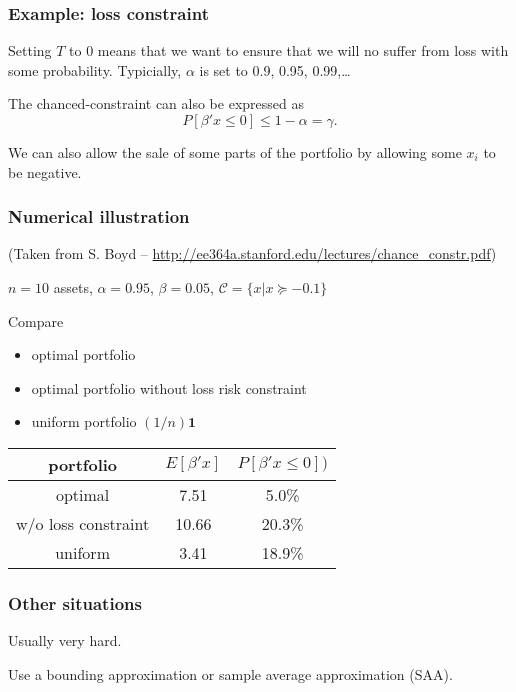 \documentclass{beamer}
\begin{document}
\begin{frame}
\frametitle{Example: loss constraint}

Setting $T$ to 0 means that we want to ensure that we will no suffer from loss with some probability. Typicially, $\alpha$ is set to 0.9, 0.95, 0.99,\ldots

\mbox{}

The chanced-constraint can also be expressed as
\[
P\left[ \beta' x \leq 0 \right] \leq 1-\alpha = \gamma.
\]

\mbox{}

We can also allow the sale of some parts of the portfolio by allowing some $x_i$ to be negative.
\end{frame}

\begin{frame}
\frametitle{Numerical illustration}

(Taken from S. Boyd -- \url{http://ee364a.stanford.edu/lectures/chance_constr.pdf})

$n = 10$ assets, $\alpha = 0.95$, $\beta = 0.05$, $\mathcal{C} = \{x | x \succeq -0.1\}$

\mbox{}

Compare
\begin{itemize}
\item
optimal portfolio
\item
optimal portfolio without loss risk constraint
\item
uniform portfolio $(1/n)\mathbf{1}$
\end{itemize}

\mbox{}

\begin{center}
\begin{tabular}{c|c|c}
portfolio & $E[\beta'x]$ & $P[\beta' x \leq 0])$ \\
\hline
optimal & 7.51 & 5.0\% \\
w/o loss constraint & 10.66 & 20.3\% \\
uniform & 3.41 & 18.9\%
\end{tabular}
\end{center}

\end{frame}

\begin{frame}
\frametitle{Other situations}

Usually very hard.

\mbox{}

Use a bounding approximation or sample average approximation (SAA).

\end{frame}
\end{document}
